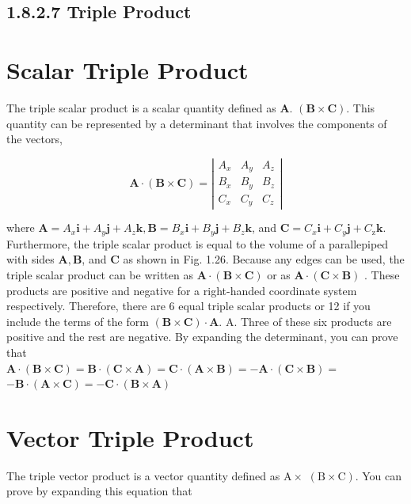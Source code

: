 \documentclass[10pt]{article}
\begin{document}
\subsection*{1.8.2.7 Triple Product}
\section*{Scalar Triple Product}
The triple scalar product is a scalar quantity defined as $\mathbf{A}$. $(\mathbf{B} \times \mathbf{C})$. This quantity can be represented by a determinant that involves the components of the vectors,

$$
\mathbf{A} \cdot(\mathbf{B} \times \mathbf{C})=\left|\begin{array}{lll}
A_{x} & A_{y} & A_{z} \\
B_{x} & B_{y} & B_{z} \\
C_{x} & C_{y} & C_{z}
\end{array}\right|
$$

where $\mathbf{A}=A_{x} \mathbf{i}+A_{y} \mathbf{j}+A_{z} \mathbf{k}, \mathbf{B}=B_{x} \mathbf{i}+B_{y} \mathbf{j}+B_{z} \mathbf{k}$, and $\mathbf{C}=C_{x} \mathbf{i}+C_{y} \mathbf{j}+C_{\mathrm{z}} \mathbf{k}$. Furthermore, the triple scalar product is equal to the volume of a parallepiped with sides $\mathbf{A}, \mathbf{B}$, and $\mathbf{C}$ as shown in Fig. 1.26. Because any edges can be used, the triple scalar product can be written as $\mathbf{A} \cdot(\mathbf{B} \times \mathbf{C})$ or as $\mathbf{A} \cdot(\mathbf{C} \times \mathbf{B})$ . These products are positive and negative for a right-handed coordinate system respectively. Therefore, there are 6 equal triple scalar products or 12 if you include the terms of the form $(\mathbf{B} \times \mathbf{C}) \cdot \mathbf{A}$. A. Three of these six products are positive and the rest are negative. By expanding the determinant, you can prove that\\
$\mathbf{A} \cdot(\mathbf{B} \times \mathbf{C})=\mathbf{B} \cdot(\mathbf{C} \times \mathbf{A})=\mathbf{C} \cdot(\mathbf{A} \times \mathbf{B})=-\mathbf{A} \cdot(\mathbf{C} \times \mathbf{B})=$ $-\mathbf{B} \cdot(\mathbf{A} \times \mathbf{C})=-\mathbf{C} \cdot(\mathbf{B} \times \mathbf{A})$

\section*{Vector Triple Product}
The triple vector product is a vector quantity defined as $\mathrm{A} \times$ $(\mathrm{B} \times \mathrm{C})$. You can prove by expanding this equation that
\end{document}
